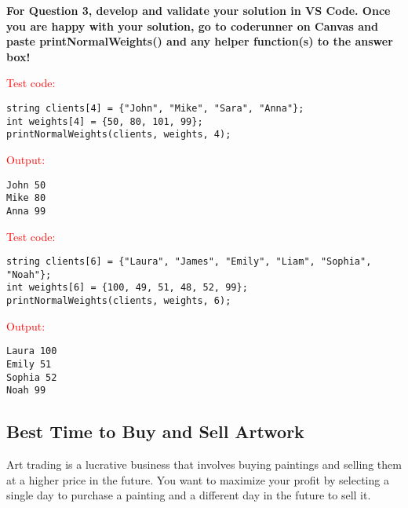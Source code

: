 \textbf{For Question 3, develop and validate your solution in VS Code. Once you are happy with your solution, go to coderunner on Canvas and paste printNormalWeights() and any helper function(s) to the answer box!} 
\begin{sample}
\textcolor{red}{Test code:}
\begin{verbatim}
string clients[4] = {"John", "Mike", "Sara", "Anna"};
int weights[4] = {50, 80, 101, 99};
printNormalWeights(clients, weights, 4);
\end{verbatim}
\textcolor{red}{Output:}
\begin{verbatim}
John 50
Mike 80
Anna 99
\end{verbatim}
\end{sample}

\begin{sample}
\textcolor{red}{Test code:}
\begin{verbatim}
string clients[6] = {"Laura", "James", "Emily", "Liam", "Sophia", "Noah"};
int weights[6] = {100, 49, 51, 48, 52, 99};
printNormalWeights(clients, weights, 6);
\end{verbatim}
\textcolor{red}{Output:}
\begin{verbatim}
Laura 100
Emily 51
Sophia 52
Noah 99
\end{verbatim}
\end{sample}

\subsection{Best Time to Buy and Sell Artwork}

Art trading is a lucrative business that involves buying paintings and selling them at a higher price in the future. You want to maximize your profit by selecting a single day to purchase a painting and a different day in the future to sell it.



